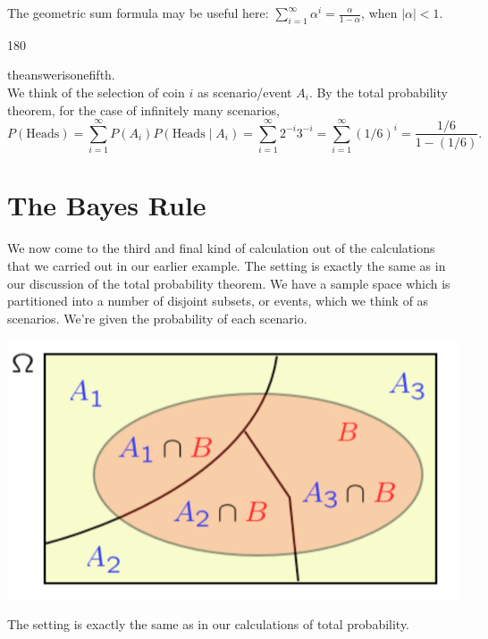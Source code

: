 \documentclass{tufte-handout}
\begin{document}
The geometric sum formula may be useful here: $\sum_{i = 1}^{\infty} \alpha^i = \frac{\alpha}{1 - \alpha}$, 
when $|\alpha| < 1$.

\vspace{3mm}
\begin{turn}{180} 
\color{teal}
\begin{minipage}{\linewidth}
\scriptsize
theanswerisonefifth.\\  
We think of the selection of coin $i$ as scenario/event $A_i$. By the total probability theorem, for the case of infinitely many scenarios,
$$ 
P(\text{Heads} ) = \sum_{i = 1}^\infty P(A_i) P(\text{Heads} \mid A_i ) = \sum_{i = 1}^\infty 2^{-i} 3^{-i} = \sum_{i = 1}^\infty (1/6)^i=\frac{1/6} {1 - (1/6)}.
$$
\end{minipage}
\end{turn}




\pagebreak
\section{The Bayes Rule}\label{sec:BayesRule}

We now come to the third and final kind of calculation out of the calculations that we carried out in our
earlier example. The setting is exactly the same as in our discussion of the total probability theorem.
We have a sample space which is partitioned into a number of disjoint subsets, or events, which we think
of as scenarios. We're given the probability of each scenario.

\begin{marginfigure}
  \includegraphics{TotalProb}
  \caption{The setting is exactly the same as in our calculations of total probability.}
\end{marginfigure}
\end{document}
